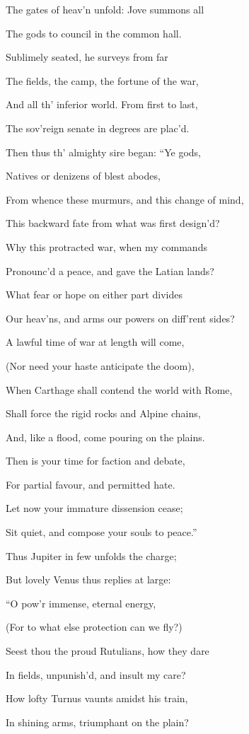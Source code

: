 The gates of heav’n unfold: Jove summons all

The gods to council in the common hall.

Sublimely seated, he surveys from far

The fields, the camp, the fortune of the war,

And all th’ inferior world. From first to last,

The sov’reign senate in degrees are plac’d.

Then thus th’ almighty sire began: “Ye gods,

Natives or denizens of blest abodes,

From whence these murmurs, and this change of mind,

This backward fate from what was first design’d?

Why this protracted war, when my commands

Pronounc’d a peace, and gave the Latian lands?

What fear or hope on either part divides

Our heav’ns, and arms our powers on diff’rent sides?

A lawful time of war at length will come,

(Nor need your haste anticipate the doom),

When Carthage shall contend the world with Rome,

Shall force the rigid rocks and Alpine chains,

And, like a flood, come pouring on the plains.

Then is your time for faction and debate,

For partial favour, and permitted hate.

Let now your immature dissension cease;

Sit quiet, and compose your souls to peace.”

Thus Jupiter in few unfolds the charge;

But lovely Venus thus replies at large:

“O pow’r immense, eternal energy,

(For to what else protection can we fly?)

Seest thou the proud Rutulians, how they dare

In fields, unpunish’d, and insult my care?

How lofty Turnus vaunts amidst his train,

In shining arms, triumphant on the plain?

